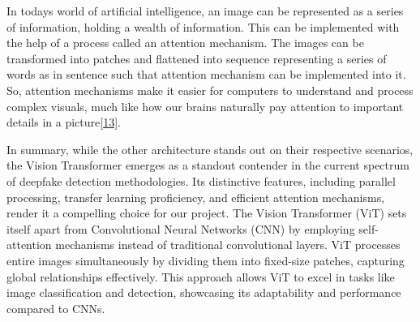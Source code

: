 \noindent In todays world of artificial intelligence, an image can be represented as a series of information, holding a wealth of information. This can be implemented with the help of a process called an attention mechanism. The images can be transformed into patches and flattened into sequence representing a series of words as in sentence such that attention mechanism can be implemented into it. So, attention mechanisms make it easier for computers to understand and process complex visuals, much like how our brains naturally pay attention to important details in a picture\hyperref[ref13]{[13]}.

\noindent In summary, while the other architecture stands out on their respective scenarios, the Vision Transformer emerges as a standout contender in the current spectrum of deepfake detection methodologies. Its distinctive features, including parallel processing, transfer learning proficiency, and efficient attention mechanisms, render it a compelling choice for our project. The Vision Transformer (ViT) sets itself apart from Convolutional Neural Networks (CNN) by employing self-attention mechanisms instead of traditional convolutional layers. ViT processes entire images simultaneously by dividing them into fixed-size patches, capturing global relationships effectively. This approach allows ViT to excel in tasks like image classification and detection, showcasing its adaptability and performance compared to CNNs.
